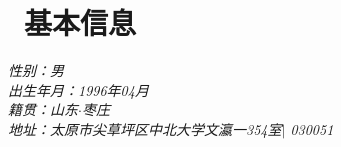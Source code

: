 \documentclass{resume}
\begin{document}

\begin{minipage}{0.65\textwidth}
\begingroup
\let\center\flushleft
\let\endcenter\endflushleft
{}
\bigbreak
\endgroup
\end{minipage}
\section{\faHome\ 基本信息}
\raggedright{\textit{\large{性别：男}}}\\ %
\textit{\large{出生年月：1996年04月}} \\%
\textit{\large{籍贯：山东$ \cdot $枣庄}}\\%
\textit{\large{地址：太原市尖草坪区中北大学文瀛一354室$|$ 030051}}
\end{document}
